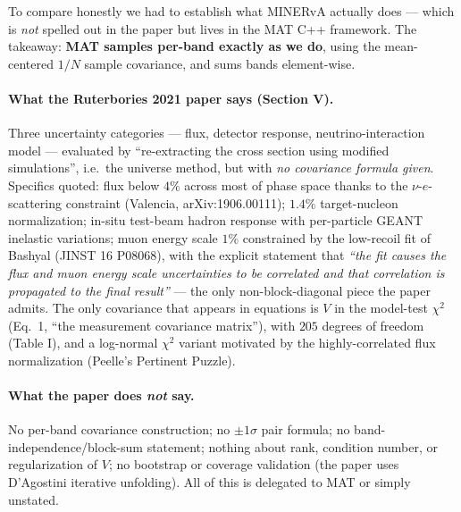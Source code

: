 \documentclass[12pt]{article}
\begin{document}
To compare honestly we had to establish what MINERvA actually does ---
which is \emph{not} spelled out in the paper but lives in the MAT C++
framework. The takeaway: \textbf{MAT samples per-band exactly as we do},
using the mean-centered $1/N$ sample covariance, and sums bands
element-wise.

\paragraph{What the Ruterbories 2021 paper says (Section V).}
Three uncertainty categories --- flux, detector response,
neutrino-interaction model --- evaluated by ``re-extracting the cross
section using modified simulations'', i.e.\ the universe method, but
with \emph{no covariance formula given}. Specifics quoted:
flux below $4\%$ across most of phase space thanks to the
$\nu$-$e$-scattering constraint (Valencia, arXiv:1906.00111);
$1.4\%$ target-nucleon normalization; in-situ test-beam hadron
response with per-particle GEANT inelastic variations; muon energy
scale $1\%$ constrained by the low-recoil fit of Bashyal
(JINST 16 P08068), with the explicit statement that
\emph{``the fit causes the flux and muon energy scale uncertainties to
be correlated and that correlation is propagated to the final
result''} --- the only non-block-diagonal piece the paper admits.
The only covariance that appears in equations is $V$ in the model-test
$\chi^{2}$ (Eq.~1, ``the measurement covariance matrix''), with $205$
degrees of freedom (Table I), and a log-normal $\chi^{2}$ variant
motivated by the highly-correlated flux normalization (Peelle's
Pertinent Puzzle).

\paragraph{What the paper does \emph{not} say.}
No per-band covariance construction; no $\pm1\sigma$ pair formula; no
band-independence/block-sum statement; nothing about rank, condition
number, or regularization of $V$; no bootstrap or coverage validation
(the paper uses D'Agostini iterative unfolding). All of this is
delegated to MAT or simply unstated.
\end{document}
